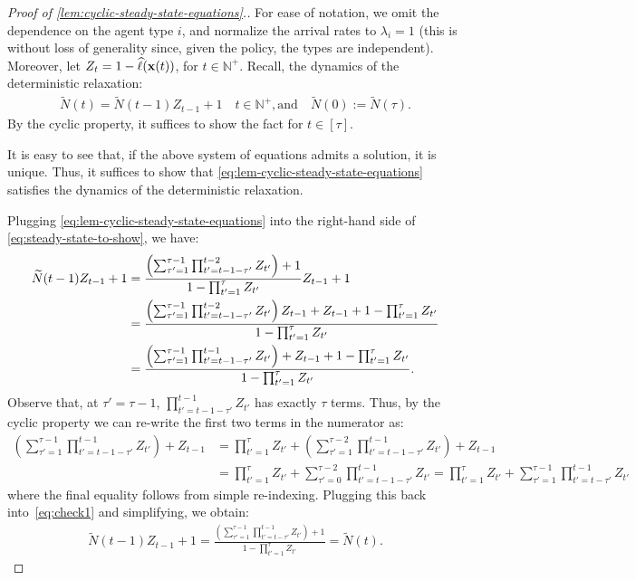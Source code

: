 \documentclass[12pt]{article}
\begin{document}
\begin{proof}[Proof of \cref{lem:cyclic-steady-state-equations}.]
For ease of notation, we omit the dependence on the agent type $i$, and normalize the arrival rates to $\lambda_i = 1$ (this is without loss of generality since, given the policy, the types are independent). Moreover, let $Z_t = 1-\widehat{\ell}(\mathbf{x}(t))$, for $t \in \mathbb{N}^+$. Recall, the dynamics of the deterministic relaxation:
\begin{align}\label{eq:steady-state-to-show}
    \widetilde{N}(t) = \widetilde{N}(t-1)Z_{t-1} + 1 \quad t \in \mathbb{N}^+, 
    \text{and} \quad \widetilde{N}(0) := \widetilde{N}(\tau).
\end{align}
By the cyclic property, it suffices to show the fact for $t \in [\tau]$.

It is easy to see that, if the above system of equations admits a solution, it is unique. Thus, it suffices to show that \eqref{eq:lem-cyclic-steady-state-equations} satisfies the dynamics of the deterministic relaxation.

Plugging \eqref{eq:lem-cyclic-steady-state-equations} into the right-hand side of \eqref{eq:steady-state-to-show}, we have:
\begin{align}\label{eq:check1}
    \widetilde{N}(t-1)Z_{t-1} + 1 &= \frac{\left(\sum_{\tau' = 1}^{\tau-1} \prod_{t'=t-1-\tau'}^{t-2}Z_{t'}\right) + 1}{1-\prod_{t'=1}^\tau Z_{t'}}Z_{t-1} + 1 \notag \\
    &= \frac{\left(\sum_{\tau' = 1}^{\tau-1} \prod_{t'=t-1-\tau'}^{t-2}Z_{t'}\right)Z_{t-1} + Z_{t-1} + 1-\prod_{t'=1}^\tau Z_{t'}}{1-\prod_{t'=1}^\tau Z_{t'}} \notag \\
    &= \frac{\left(\sum_{\tau' = 1}^{\tau-1} \prod_{t'=t-1-\tau'}^{t-1}Z_{t'}\right) + Z_{t-1} + 1-\prod_{t'=1}^\tau Z_{t'}}{1-\prod_{t'=1}^\tau Z_{t'}}.
\end{align}
Observe that, at $\tau' = \tau-1$, $\prod_{t'=t-1-\tau'}^{t-1}Z_{t'}$ has exactly $\tau$ terms. Thus, by the cyclic property we can re-write the first two terms in the numerator as:
\begin{align*}
\left(\sum_{\tau' = 1}^{\tau-1} \prod_{t'=t-1-\tau'}^{t-1}Z_{t'}\right) + Z_{t-1} &= \prod_{t'=1}^{\tau} Z_{t'} + \left(\sum_{\tau' = 1}^{\tau-2} \prod_{t'=t-1-\tau'}^{t-1}Z_{t'}\right) + Z_{t-1} \\
&=\prod_{t'=1}^{\tau} Z_{t'} + \sum_{\tau' = 0}^{\tau-2} \prod_{t'=t-1-\tau'}^{t-1}Z_{t'}
= \prod_{t'=1}^{\tau} Z_{t'} + \sum_{\tau' = 1}^{\tau-1} \prod_{t'=t-\tau'}^{t-1}Z_{t'}
\end{align*}
where the final equality follows from simple re-indexing. Plugging this back into~\eqref{eq:check1} and simplifying, we obtain:
\begin{align*}
    \widetilde{N}(t-1)Z_{t-1} + 1 = \frac{\left(\sum_{\tau' = 1}^{\tau-1} \prod_{t'=t-\tau'}^{t-1}Z_{t'}\right) + 1}{1-\prod_{t'=1}^\tau Z_{t'}} = \widetilde{N}(t).
\end{align*}
\end{proof}
\end{document}
